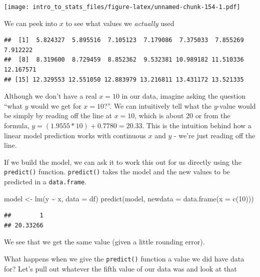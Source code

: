 \documentclass[
]{book}
\newenvironment{Shaded}{\begin{snugshade}}{\end{snugshade}}
\newcommand{\AttributeTok}[1]{\textcolor[rgb]{0.77,0.63,0.00}{#1}}
\newcommand{\DecValTok}[1]{\textcolor[rgb]{0.00,0.00,0.81}{#1}}
\newcommand{\FunctionTok}[1]{\textcolor[rgb]{0.00,0.00,0.00}{#1}}
\newcommand{\NormalTok}[1]{#1}
\newcommand{\OtherTok}[1]{\textcolor[rgb]{0.56,0.35,0.01}{#1}}
\newcommand{\SpecialCharTok}[1]{\textcolor[rgb]{0.00,0.00,0.00}{#1}}
\begin{document}
\texttt{[image: intro\_to\_stats\_files/figure-latex/unnamed-chunk-154-1.pdf]}

We can peek into \(x\) to see what values we \emph{actually} used

\begin{Shaded}
\end{Shaded}

\begin{verbatim}
##  [1]  5.824327  5.895516  7.105123  7.179086  7.375033  7.855269  7.912222
##  [8]  8.319600  8.729459  8.852362  9.532381 10.989182 11.510336 12.167571
## [15] 12.329553 12.551050 12.883979 13.216811 13.431172 13.521335
\end{verbatim}

Although we don't have a real \(x = 10\) in our data, imagine asking the question ``what \(y\) would we get for \(x = 10\)?''. We can intuitively tell what the \(y\)-value would be simply by reading off the line at \(x = 10\), which is about 20 or from the formula, \(y = (1.9555 * 10) + 0.7780 = 20.33\). This is the intuition behind how a linear model prediction works with continuous \(x\) and \(y\) - we're just reading off the line.

If we build the model, we can ask it to work this out for us directly using the \texttt{predict()} function. \texttt{predict()} takes the model and the new values to be predicted in a \texttt{data.frame}.

\begin{Shaded}
\begin{Highlighting}[]
\NormalTok{model }\OtherTok{\textless{}{-}} \FunctionTok{lm}\NormalTok{(y }\SpecialCharTok{\textasciitilde{}}\NormalTok{ x, }\AttributeTok{data =}\NormalTok{ df)}
\FunctionTok{predict}\NormalTok{(model, }\AttributeTok{newdata =} \FunctionTok{data.frame}\NormalTok{(}\AttributeTok{x =} \FunctionTok{c}\NormalTok{(}\DecValTok{10}\NormalTok{)))}
\end{Highlighting}
\end{Shaded}

\begin{verbatim}
##        1 
## 20.33266
\end{verbatim}

We see that we get the same value (given a little rounding error).

What happens when we give the \texttt{predict()} function a value we did have data for? Let's pull out whatever the fifth value of our data was and look at that
\end{document}
